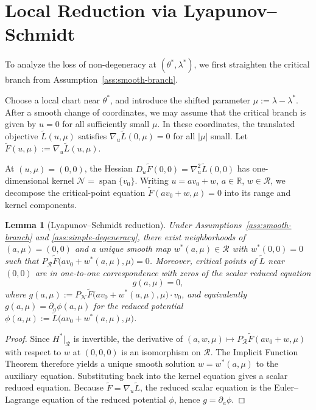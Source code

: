 \documentclass[11pt, reqno]{amsart}
\theoremstyle{plain}
\newtheorem{lemma}[theorem]{Lemma}
\theoremstyle{definition}
\theoremstyle{remark}
\DeclareMathOperator{\spanop}{span}
\begin{document}
\section{Local Reduction via Lyapunov--Schmidt}\label{sec:LS}

To analyze the loss of non-degeneracy at $(\theta^*,\lambda^*)$, we first straighten the critical branch from Assumption~\ref{ass:smooth-branch}.

Choose a local chart near $\theta^*$, and introduce the shifted parameter
$\mu:=\lambda-\lambda^*$.
After a smooth change of coordinates, we may assume that the critical branch is given by $u=0$
for all sufficiently small $\mu$. In these coordinates, the translated objective
$\widetilde L(u,\mu)$
satisfies
$\nabla_u \widetilde L(0,\mu)=0$
for all $|\mu|$ small.  Let $\widetilde F(u,\mu):=\nabla_u \widetilde L(u,\mu)$.

At $(u,\mu)=(0,0)$, the Hessian
$D_u\widetilde F(0,0)=\nabla_u^2\widetilde L(0,0)$
has one-dimensional kernel $\mathcal N=\spanop\{v_0\}$. Writing
$u=av_0+w$, $a\in\mathbb R$, $w\in\mathcal R$,
we decompose the critical-point equation
$\widetilde F(av_0+w,\mu)=0$
into its range and kernel components.

\begin{lemma}[Lyapunov--Schmidt reduction]\label{lem:LS}
Under Assumptions~\ref{ass:smooth-branch} and \ref{ass:simple-degeneracy}, there exist neighborhoods of $(a,\mu)=(0,0)$ and a unique smooth map
$w^*(a,\mu)\in\mathcal R$
with $w^*(0,0)=0$ such that
$P_{\mathcal R}\widetilde F\bigl(av_0+w^*(a,\mu),\mu\bigr)=0$.
Moreover, critical points of $\widetilde L$ near $(0,0)$ are in one-to-one correspondence with zeros of the scalar reduced equation
\begin{equation}
  g(a,\mu)=0,
\end{equation}
where
$g(a,\mu):=P_{\mathcal N}\widetilde F\bigl(av_0+w^*(a,\mu),\mu\bigr)\cdot v_0$,
and equivalently $g(a,\mu)=\partial_a\phi(a,\mu)$
for the reduced potential
$\phi(a,\mu):=\widetilde L\bigl(av_0+w^*(a,\mu),\mu\bigr)$.
\end{lemma}

\begin{proof}
Since $H^*|_{\mathcal R}$ is invertible, the derivative of
$(a,w,\mu)\mapsto P_{\mathcal R}\widetilde F(av_0+w,\mu)$
with respect to $w$ at $(0,0,0)$ is an isomorphism on $\mathcal R$. The Implicit Function Theorem therefore yields a unique smooth solution $w=w^*(a,\mu)$ to the auxiliary equation. Substituting back into the kernel equation gives a scalar reduced equation. Because $\widetilde F=\nabla_u\widetilde L$, the reduced scalar equation is the Euler--Lagrange equation of the reduced potential $\phi$, hence $g=\partial_a\phi$.
\end{proof}
\end{document}
